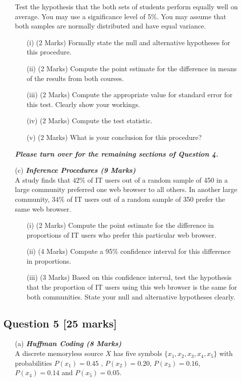 \documentclass[a4paper,12pt]{article}
\begin{document}
\begin{itemize}
\begin{itemize}
Test the hypothesis that the both sets of students perform equally well on average. You may use a significance level of 5\%. You may assume that both samples are normally distributed and have equal variance.
\begin{itemize}
\item[(i)] (2 Marks) Formally state the null and alternative hypotheses for this procedure.
\item[(ii)] (2 Marks) Compute the point estimate for the difference in means of the results from both courses.
\item[(iii)] (2 Marks) Compute the appropriate value for standard error for this test. Clearly show your workings.
\item[(iv)] (2 Marks) Compute the test statistic.
\item[(v)] (2 Marks) What is your conclusion for this procedure?
\end{itemize}
{
\normalsize
\textit{\textbf{Please turn over for the remaining sections of Question 4.}}
}
\newpage
\item[(c)] \textbf{\textit{Inference Procedures (9 Marks)}}\\A study finds that $42\%$ of IT users out of a random sample of 450 in a large
community preferred one web browser to all others. In another large community, $34\%$ of IT users out of a random sample of 350 prefer the same web browser.

\begin{itemize}
\item[(i)] (2 Marks) Compute the point estimate for the difference in proportions of IT users who prefer this particular web browser.
\item[(ii)] (4 Marks) Compute a 95\% confidence interval for this difference in proportions.
\item[(iii)] (3 Marks) Based on this confidence interval, test the hypothesis that the proportion of IT users using this web browser is the same for both communities. State your null and alternative hypotheses clearly.
\end{itemize}

\end{itemize}

\newpage
\subsection*{Question 5 [25 marks] }
\begin{itemize}
\item[(a)] \textbf{\textit{Huffman Coding (8 Marks)}}\\
A discrete memoryless source $X$ has five symbols $\{x_1,x_2,x_3,x_4,x_5\}$ with probabilities $P(x_1) = 0.45$ , $P(x_2) = 0.20$, $P(x_3) = 0.16$, $P(x_4) = 0.14$ and $P(x_5) = 0.05$.


\end{itemize}
\end{itemize}
\end{document}
